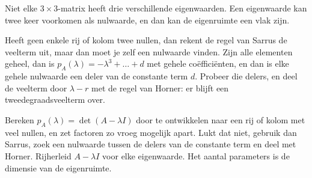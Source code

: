 Niet elke $3 \times 3$-matrix heeft drie verschillende eigenwaarden. Een eigenwaarde kan twee keer voorkomen als nulwaarde, en dan kan de eigenruimte een vlak zijn.


Heeft geen enkele rij of kolom twee nullen, dan rekent de regel van Sarrus de veelterm uit, maar dan moet je zelf een nulwaarde vinden. Zijn alle elementen geheel, dan is $p_A(\lambda) = -\lambda^3 + \ldots + d$ met gehele coëfficiënten, en dan is elke gehele nulwaarde een deler van de constante term $d$. Probeer die delers, en deel de veelterm door $\lambda - r$ met de regel van Horner: er blijft een tweedegraadsveelterm over.

\begin{werkwijze}
Bereken $p_A(\lambda) = \det(A - \lambda I)$ door te ontwikkelen naar een rij of kolom met veel nullen, en zet factoren zo vroeg mogelijk apart. Lukt dat niet, gebruik dan Sarrus, zoek een nulwaarde tussen de delers van de constante term en deel met Horner. Rijherleid $A - \lambda I$ voor elke eigenwaarde. Het aantal parameters is de dimensie van de eigenruimte.
\end{werkwijze}


